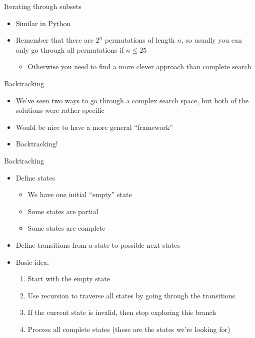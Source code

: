 \documentclass[12pt,t]{beamer}
\newcommand{\bi}{\begin{itemize}}
\newcommand{\ei}{\end{itemize}}
\begin{document}
\begin{frame}{Iterating through subsets}
    \vspace{40pt}

    \bi
        \item Similar in Python
        \vspace{20pt}
        \item Remember that there are $2^n$ permutations of length $n$, so usually you can only go through all permutations if $n \leq 25$
            \bi
                \item Otherwise you need to find a more clever approach than complete search
            \ei
            \vspace{20pt}
    \ei
\end{frame}


\begin{frame}[fragile]{Backtracking}
    \vspace{30pt}

    \bi
        \item We've seen two ways to go through a complex search space, but both of the solutions were rather specific
        \item Would be nice to have a more general ``framework''
        \vspace{10pt}
        \item Backtracking!
    \ei
\end{frame}

\begin{frame}[fragile]{Backtracking}
    \vspace{20pt}
    \bi
        \item Define states
            \bi
                \item We have one initial ``empty'' state
                \item Some states are partial
                \item Some states are complete
            \ei
        \vspace{10pt}
        \item Define transitions from a state to possible next states
        \vspace{10pt}
        \item Basic idea:
            \begin{enumerate}
                \item Start with the empty state
                \item Use recursion to traverse all states by going through the transitions
                \item If the current state is invalid, then stop exploring this branch
                \item Process all complete states (these are the states we're looking for)
            \end{enumerate}
    \ei
\end{frame}
\end{document}

